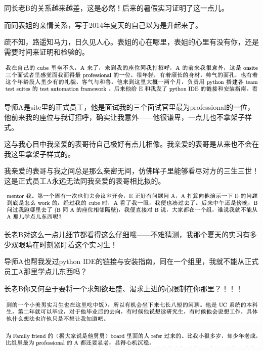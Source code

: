 \documentclass[9pt, b5paper]{article}
\begin{document}
同长老B的关系越来越差，这是必然！后来的暑假实习证明了这一点儿。

而同表姐的亲情关系，写于2014年夏天的自己以为是升起来了。

疏不知，路遥知马力，日久见人心。表姐的心在哪里，表姐的心里有没有你，还是需要时间来证明和检验的。 

\begin{center}
\includegraphics[width=.9\linewidth]{./pic/backups_plans_20210504_215428.png}
\end{center}

导师A是site里的正式员工，他是面试我的三个面试官里最为professional的一位，他前来我的座位与我订招呼，确实让我意外——他很谦卑，一点儿也不拿架子样式。

这与我心目中我亲爱的表哥待自己极好有点儿相像。我亲爱的表哥是从来也不会在我这里拿架子样式的。

我亲爱的表哥与我之间总是那么亲密无间，仿佛眸子里能够看尽对方的三生三世！这是正式员工A永远无法同我亲爱的表哥相比拟的。 

\begin{center}
\includegraphics[width=.9\linewidth]{./pic/backups_plans_20210505_112820.png}
\end{center}

长老B对这么一点儿细节都看得这么仔细哦——不难猜测，我那个夏天的实习有多少双眼睛在时刻紧盯着这个实习生！

导师A也帮我发过python IDE的链接与安装指南，同在一个组里，我就不能从正式员工A那里学点儿东西吗？

长老B你又何至于要将一个求知欲旺盛、渴求上进的心限制在你那里？！！！

\begin{center}
\includegraphics[width=.9\linewidth]{./pic/backups_plans_20210504_220151.png}
\end{center}

\begin{center}
\includegraphics[width=.9\linewidth]{./pic/backups_plans_20210504_220232.png}
\end{center}
\end{document}
